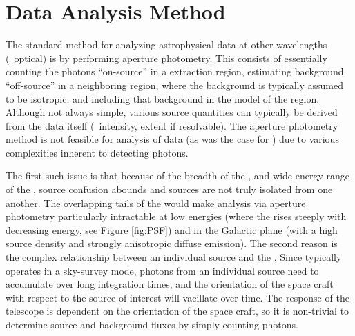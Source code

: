 


\section{\label{FGST:analysis}\FermiLat{} Data Analysis Method}
The standard method for analyzing astrophysical data at other wavelengths (\eg{}\ optical) is by performing aperture photometry. This consists of essentially counting the photons ``on-source'' in a extraction region, estimating background ``off-source'' in a neighboring region, where the background is typically assumed to be isotropic, and including that background in the model of the region. Although not always simple, various source quantities can typically be derived from the data itself (\eg{}\ intensity, extent if resolvable). The aperture photometry method is not feasible for analysis of \Fermi{} data (as was the case for \egret{} \cite{mattox96}) due to various complexities inherent to detecting \gam{} photons. 

The first such issue is that because of the breadth of the \lat{} \psf{}, and wide energy range of the \lat{}, source confusion abounds and sources are not truly isolated from one another. The overlapping tails of the \psf{} would make analysis via aperture photometry particularly intractable at low energies (where the \psf{} rises steeply with decreasing energy, see Figure \ref{fig:PSF}) and in the Galactic plane (with a high source density and strongly anisotropic diffuse emission).\jamie{\ref{FGST:diff?}} The second reason is the complex relationship between an individual source and the \irf{}. Since \Fermi{} typically operates in a sky-survey mode, photons from an individual source need to accumulate over long integration times, and the orientation of the space craft with respect to the source of interest will vacillate over time. The response of the telescope is dependent on the orientation of the space craft, so it is non-trivial to determine source and background fluxes by simply counting photons.

